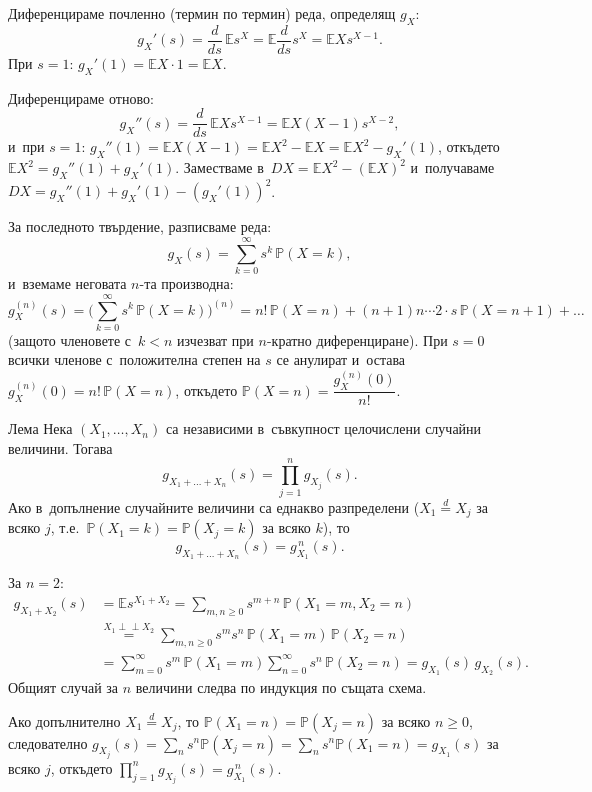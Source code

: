 \begin{proofbox}
Диференцираме почленно (термин по термин) реда, определящ $g_X$:
\[
  g_X'(s) = \frac{d}{ds}\,\mathbb Es^X = \mathbb E\frac{d}{ds}s^X = \mathbb EXs^{X-1}.
\]
При $s=1$: $g_X'(1)=\mathbb EX\cdot1=\mathbb EX$.

Диференцираме отново:
\[
  g_X''(s) = \frac{d}{ds}\,\mathbb EXs^{X-1} = \mathbb EX(X-1)s^{X-2},
\]
и~при $s=1$: $g_X''(1)=\mathbb EX(X-1)=\mathbb EX^2-\mathbb EX =
\mathbb EX^2-g_X'(1)$, откъдето $\mathbb EX^2 = g_X''(1)+g_X'(1)$.
Заместваме в~$DX=\mathbb EX^2-(\mathbb EX)^2$ и~получаваме
$DX=g_X''(1)+g_X'(1)-(g_X'(1))^2$.

За последното твърдение, разписваме реда:
\[
  g_X(s) = \sum_{k=0}^{\infty} s^k\,\mathbb P(X=k),
\]
и~вземаме неговата $n$-та производна:
\[
  g_X^{(n)}(s) = \Big(\sum_{k=0}^{\infty}s^k\,\mathbb P(X=k)\Big)^{(n)} = n!\,\mathbb P(X=n) + (n{+}1)n\cdots2\cdot s\,\mathbb P(X=n{+}1) + \dots
\]
(защото членовете с~$k<n$ изчезват при $n$-кратно диференциране).
При $s=0$ всички членове с~положителна степен на $s$ се анулират и~остава $g_X^{(n)}(0) = n!\,\mathbb P(X=n)$, откъдето
$\mathbb P(X=n) = \dfrac{g_X^{(n)}(0)}{n!}$. \qedbg
\end{proofbox}

\begin{thmbox}[]{Лема}
Нека $(X_1,\dots,X_n)$ са независими в~съвкупност целочислени
случайни величини. Тогава
\[
  g_{X_1+\dots+X_n}(s) = \prod_{j=1}^{n} g_{X_j}(s).
\]
Ако в~допълнение случайните величини са еднакво разпределени
($X_1\stackrel{d}{=}X_j$ за всяко $j$, т.е.\ $\mathbb P(X_1=k)=
\mathbb P(X_j=k)$ за всяко $k$), то
\[
  g_{X_1+\dots+X_n}(s) = g_{X_1}^{\,n}(s).
\]
\end{thmbox}

\begin{proofbox}
За $n=2$:
\begin{align*}
  g_{X_1+X_2}(s) &= \mathbb Es^{X_1+X_2} = \sum_{m,n\ge0} s^{m+n}\,\mathbb P(X_1=m,X_2=n)\\
  &\overset{X_1\perp\!\!\!\perp X_2}{=} \sum_{m,n\ge0} s^m s^n\,\mathbb P(X_1=m)\,\mathbb P(X_2=n)\\
  &= \sum_{m=0}^{\infty} s^m\,\mathbb P(X_1=m) \sum_{n=0}^{\infty} s^n\,\mathbb P(X_2=n) = g_{X_1}(s)\,g_{X_2}(s).
\end{align*}
Общият случай за $n$ величини следва по индукция по същата схема.

Ако допълнително $X_1\stackrel{d}{=}X_j$, то $\mathbb P(X_1=n)=
\mathbb P(X_j=n)$ за всяко $n\ge0$, следователно $g_{X_j}(s)=
\sum_n s^n\mathbb P(X_j=n) = \sum_n s^n\mathbb P(X_1=n)=g_{X_1}(s)$
за всяко $j$, откъдето $\prod_{j=1}^n g_{X_j}(s) = g_{X_1}^{\,n}(s)$.
\qedbg
\end{proofbox}

